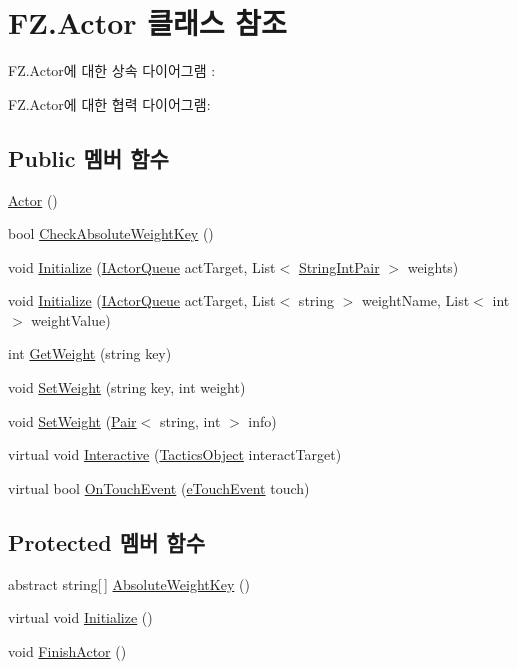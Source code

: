 \hypertarget{class_f_z_1_1_actor}{}\section{F\+Z.\+Actor 클래스 참조}
\label{class_f_z_1_1_actor}


F\+Z.\+Actor에 대한 상속 다이어그램 \+: 


F\+Z.\+Actor에 대한 협력 다이어그램\+:
\subsection*{Public 멤버 함수}
\begin{DoxyCompactItemize}
\item 
\hyperlink{class_f_z_1_1_actor_aff143f814855a85dd0668ef12f46ef21}{Actor} ()
\item 
bool \hyperlink{class_f_z_1_1_actor_aa78fa8d765cfc56474c3714d38bcc13b}{Check\+Absolute\+Weight\+Key} ()
\item 
void \hyperlink{class_f_z_1_1_actor_ac29de02b4c3cc1012143f6531f5809ed}{Initialize} (\hyperlink{interface_f_z_1_1_i_actor_queue}{I\+Actor\+Queue} act\+Target, List$<$ \hyperlink{class_f_z_1_1_string_int_pair}{String\+Int\+Pair} $>$ weights)
\item 
void \hyperlink{class_f_z_1_1_actor_a968a8b42fa52f121bdcc9c8ea8136eb9}{Initialize} (\hyperlink{interface_f_z_1_1_i_actor_queue}{I\+Actor\+Queue} act\+Target, List$<$ string $>$ weight\+Name, List$<$ int $>$ weight\+Value)
\item 
int \hyperlink{class_f_z_1_1_actor_ab6dee08c1296f3c020694fd9408b7c33}{Get\+Weight} (string key)
\item 
void \hyperlink{class_f_z_1_1_actor_a0f36cb598cc81fc94bf5de590382004e}{Set\+Weight} (string key, int weight)
\item 
void \hyperlink{class_f_z_1_1_actor_a6c257b538187513e247b92905da53954}{Set\+Weight} (\hyperlink{class_f_z_1_1_pair}{Pair}$<$ string, int $>$ info)
\item 
virtual void \hyperlink{class_f_z_1_1_actor_a1d5780d31a35893d38598d78c8f0c74a}{Interactive} (\hyperlink{class_tactics_object}{Tactics\+Object} interact\+Target)
\item 
virtual bool \hyperlink{class_f_z_1_1_actor_a9f30b12f3615a447df054d48ef4e22c7}{On\+Touch\+Event} (\hyperlink{_touch_manager_8cs_ae33e321a424fe84ba8b2fdb81ad40a68}{e\+Touch\+Event} touch)
\end{DoxyCompactItemize}
\subsection*{Protected 멤버 함수}
\begin{DoxyCompactItemize}
\item 
abstract string\mbox{[}$\,$\mbox{]} \hyperlink{class_f_z_1_1_actor_aade2d1f3a48ea90fe361a2e0e3ff9985}{Absolute\+Weight\+Key} ()
\item 
virtual void \hyperlink{class_f_z_1_1_actor_a57abd0487ac5f6b273d1a9e06b3087ef}{Initialize} ()
\item 
void \hyperlink{class_f_z_1_1_actor_a26e516ab18ada56bb6a9e26c8fd6b709}{Finish\+Actor} ()
\end{DoxyCompactItemize}
